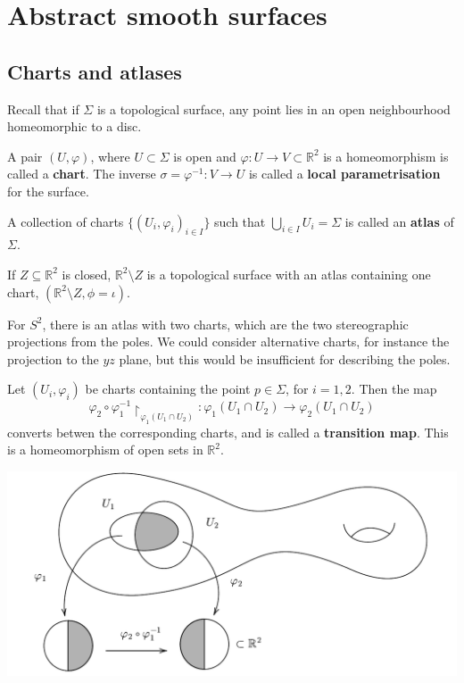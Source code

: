\documentclass[a4paper]{article}
\begin{document}
\section{Abstract smooth surfaces}
\subsection{Charts and atlases}
Recall that if \( \Sigma \) is a topological surface, any point lies in an open neighbourhood homeomorphic to a disc.
\begin{definition}
	A pair \( (U, \varphi) \), where $ U \subset \Sigma $ is open and $ \varphi:U\to V \subset \mathbb{R}^{2} $ is a homeomorphism is called a \textbf{chart}. The inverse \( \sigma = \varphi^{-1} \colon V \to U \) is called a \textbf{local parametrisation} for the surface.
\end{definition}

\begin{definition}
	A collection of charts $ \{(U_i,\varphi_i)_{i\in I}\} $ such that $ \bigcup_{i\in I} U_i = \Sigma $ is called an \textbf{atlas} of $\Sigma$. 
\end{definition}
\begin{example}
	If \( Z \subseteq \mathbb R^2 \) is closed, \( \mathbb R^2 \setminus Z \) is a topological surface with an atlas containing one chart, \( (\mathbb R^2 \setminus Z, \phi = \iota) \).

	For \( S^2 \), there is an atlas with two charts, which are the two stereographic projections from the poles.
	We could consider alternative charts, for instance the projection to the \( yz \) plane, but this would be insufficient for describing the poles.
\end{example}
\begin{definition}
	Let \( (U_i, \varphi_i) \) be charts containing the point \( p \in \Sigma \), for \( i = 1, 2 \).
	Then the map
	\[
		\varphi_2 \circ\varphi_1^{-1}\restriction_{\varphi_1(U_1 \cap U_2)} \colon \varphi_1(U_1 \cap U_2) \to \varphi_2(U_1 \cap U_2)
	\]
	converts betwen the corresponding charts, and is called a \textbf{transition map}.
	This is a homeomorphism of open sets in \( \mathbb R^2 \).
\end{definition}

\begin{center}
\includegraphics[scale=.7]{Geo1}
\end{center}
\end{document}
